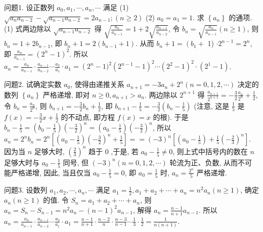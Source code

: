
问题1. 设正数列 $a_0, a_1, \cdots, a_n, \cdots$ 满足
(1) $\sqrt{a_n a_{n-2}}-\sqrt{a_{n-1} a_{n-2}}=2 a_{n-1} ;(n \geqslant 2)$
(2) $a_0=a_1=1$.
求 $\left\{a_n\right\}$ 的通项.
(1) 式两边除以 $\sqrt{a_{n-1} a_{n-2}}$ 得 $\sqrt{\frac{a_n}{a_{n-1}}}=1+2 \sqrt{\frac{a_{n-1}}{a_{n-2}}}$, 令 $b_n= \sqrt{\frac{a_n}{a_{n-1}}}(n \geqslant 1)$, 则 $b_n=1+2 b_{n-1}$, 即 $b_n+1=2\left(b_{n-1}+1\right)$. 从而 $b_n+1=\left(b_1+\right.$ 1) $\cdot 2^{n-1}=2^n$, 即 $\frac{a_n}{a_{n-1}}=\left(2^n-1\right)^2$. 所以 $a_n=\frac{a_n}{a_{n-1}} \cdot \frac{a_{n-1}}{a_{n-2}} \cdots \frac{a_2}{a_1} \cdot a_1=\left(2^n-\right. 1)^2\left(2^{n-1}-1\right)^2 \cdots\left(2^2-1\right)^2 \cdot\left(2^1-1\right)$.



问题2. 试确定实数 $a_0$, 使得由递推关系 $a_{n+1}=-3 a_n+2^n(n=0,1,2, \cdots)$ 决定的数列 $\left\{a_n\right\}$ 严格递增, 即对 $n \geqslant 0, a_{n+1}>a_n$.
两边除以 $2^{n+1}$ 得 $\frac{a_{n+1}}{2^{n+1}}=-\frac{3}{2} \frac{a_n}{2^n}+\frac{1}{2}$, 令 $b_n=\frac{a_n}{2^n}$, 则 $b_{n+1}=-\frac{3}{2} b_n+\frac{1}{2}$, 即 $b_{n+1}-\frac{1}{5}=-\frac{3}{2}\left(b_n-\frac{1}{5}\right)$ (注意, 这是 $\frac{1}{5}$ 是 $f(x)=-\frac{3}{2} x+\frac{1}{2}$ 的不动点, 即方程 $f(x)=x$ 的根). 于是 $b_n-\frac{1}{5}=\left(b_0-\frac{1}{5}\right)\left(-\frac{3}{2}\right)^n=\left(a_0-\frac{1}{5}\right)\left(-\frac{3}{2}\right)^n$, 所以 $a_n=2^n b_n=2^n\left[\left(a_0-\frac{1}{5}\right)\left(-\frac{3}{2}\right)^n+\frac{1}{5}\right]==(-3)^n\left[\left(a_0-\frac{1}{5}\right)+\frac{1}{5}\left(-\frac{2}{3}\right)^n\right]$. 
因为当 $n$ 足够大时, $\left(\frac{2}{3}\right)^n$ 趋于 0 ,于是, 若 $a_0-\frac{1}{5} \neq 0$, 则上式中括号内的数在 $n$ 足够大时与 $a_0-\frac{1}{5}$ 同号, 但 $(-3)^n(n=0,1,2, \cdots)$ 轮流为正、负数, 从而不可能严格递增, 因此, 当且仅当 $a_0-\frac{1}{5}=0$, 即 $a_0=\frac{1}{5}$ 时, $a_n=\frac{2^n}{5}$ 严格递增.



问题3. 设数列 $a_1, a_2, \cdots, a_n, \cdots$ 满足 $a_1=\frac{1}{2}, a_1+a_2+\cdots+a_n=n^2 a_n(n \geqslant 1)$, 确定 $a_n(n \geqslant 1)$ 的值.
令 $S_n=a_1+a_2+\cdots+a_n$, 则 $a_n=S_n-S_{n-1}=n^2 a_n-(n-1)^2 a_{n-1}$, 解得 $a_n=\frac{n-1}{n+1} a_{n-1}$. 所以 $a_n=\frac{a_n}{a_{n-1}} \cdot \frac{a_{n-1}}{a_{n-2}} \cdots \frac{a_2}{a_1} \cdot a_1=\frac{n-1}{n+1} \cdot \frac{n-2}{n} \cdot \frac{n-3}{n-1} \cdots \frac{1}{3} \cdot \frac{1}{2}= \frac{1}{n(n+1)}$.



